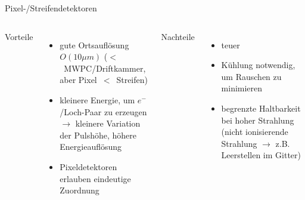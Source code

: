 \begin{frame}{Pixel-/Streifendetektoren}
    \begin{columns}[T]
			Vorteile		
			\begin{itemize}
			  \item gute Ortsauflösung $O(10\mu m)$  ($<$~MWPC/Driftkammer, aber Pixel~$<$~Streifen)
			  \item kleinere Energie, um $e^-$/Loch-Paar zu erzeugen $\rightarrow$ kleinere Variation der
			  Pulshöhe, höhere Energieauflösung
			  \item Pixeldetektoren erlauben eindeutige Zuordnung
			\end{itemize}	
	    	Nachteile
	    	\begin{itemize}
			  \item teuer
			  \item Kühlung notwendig, um Rauschen zu minimieren
			  \item begrenzte Haltbarkeit bei hoher Strahlung (nicht ionisierende Strahlung $\rightarrow$
			  z.B. Leerstellen im Gitter)
			\end{itemize}
    \end{columns}
   \end{frame}
   
